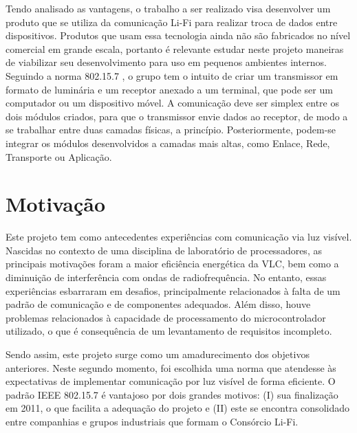	Tendo analisado as vantagens, o trabalho a ser realizado visa desenvolver um produto que se utiliza da comunicação Li-Fi para realizar troca de dados entre dispositivos. Produtos que usam essa tecnologia ainda não são fabricados no nível comercial em grande escala, portanto é relevante estudar neste projeto maneiras de viabilizar seu desenvolvimento para uso em pequenos ambientes internos. Seguindo a norma 802.15.7 \cite{lifi-standard}, o grupo tem o intuito de criar um transmissor em formato de luminária e um receptor anexado a um terminal, que pode ser um computador ou um dispositivo móvel. A comunicação deve ser simplex entre os dois módulos criados, para que o transmissor envie dados ao receptor, de modo a se trabalhar entre duas camadas físicas, a princípio. Posteriormente, podem-se integrar os módulos desenvolvidos a camadas mais altas, como Enlace, Rede, Transporte ou Aplicação. 

	
	\section{Motivação}\label{sec-motivacao}
	
	Este projeto tem como antecedentes experiências com comunicação via luz visível. Nascidas no contexto de uma disciplina de laboratório de processadores, as principais motivações foram a maior eficiência energética da VLC, bem como a diminuição de interferência com ondas de radiofrequência. No entanto, essas experiências esbarraram em desafios, principalmente relacionados à falta de um padrão de comunicação e de componentes adequados. Além disso, houve problemas relacionados à capacidade de processamento do microcontrolador utilizado, o que é consequência de um levantamento de requisitos incompleto.
	
	Sendo assim, este projeto surge como um amadurecimento dos objetivos anteriores. Neste segundo momento, foi escolhida uma norma que atendesse às expectativas de implementar comunicação por luz visível de forma eficiente. O padrão IEEE 802.15.7 é vantajoso por dois grandes motivos:
	(I) sua finalização em 2011, o que facilita a adequação do projeto e (II) este se encontra consolidado entre companhias e grupos industriais que formam o Consórcio Li-Fi.